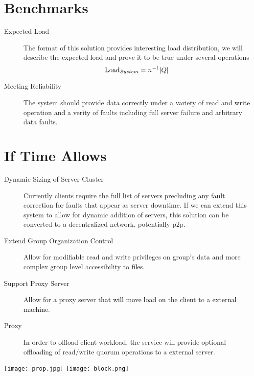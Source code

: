 \documentclass[11pt,a4paper,notitlepage,twocolumn]{report}
\begin{document}
\section{Benchmarks}
\begin{description}

\item[Expected Load]The format of this solution provides interesting load distribution, we will describe the expected load and prove it to be true under several operations
\begin{equation}
{\rm Load}_{System} = n^{-1}|Q| 
\end{equation}

\item[Meeting Reliability]The system should provide data correctly under a variety of read and write operation and a verity of faults including full server failure and arbitrary data faults.
\end{description}
\section{If Time Allows}
\begin{description}

\item[Dynamic Sizing of Server Cluster] Currently clients require the full list of servers precluding any fault correction for faults that appear as server downtime. If we can extend this system to allow for dynamic addition of servers, this solution can be converted to a decentralized network, potentially p2p.

\item[Extend Group Organization Control] Allow for modifiable read and write privileges on group’s data and more complex group level accessibility to files.
 \item[Support Proxy Server] Allow for a proxy server that will move load on the client to a external machine. 
\item[Proxy]
In order to offload client workload, the service will provide optional offloading of read/write quorum operations to a external server. 
\end{description}
\texttt{[image: prop.jpg]}
\linebreak
\texttt{[image: block.png]}
\end{document}
